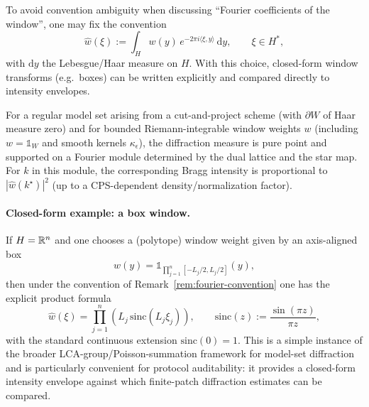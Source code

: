 \begin{remark}\label{rem:fourier-convention}
To avoid convention ambiguity when discussing ``Fourier coefficients of the window'', one may fix the convention
\[
\widehat{w}(\xi):=\int_H w(y)\,e^{-2\pi i \langle \xi,y\rangle}\,\mathrm{d}y,\qquad \xi\in H^\ast,
\]
with $\mathrm{d}y$ the Lebesgue/Haar measure on $H$. With this choice, closed-form window transforms (e.g.\ boxes) can be written explicitly and compared directly to intensity envelopes.
\end{remark}

\begin{proposition}\label{prop:diffraction-intensity}
For a regular model set arising from a cut-and-project scheme (with $\partial W$ of Haar measure zero) and for bounded Riemann-integrable window weights $w$ (including $w=\mathds{1}_W$ and smooth kernels $\kappa_\epsilon$), the diffraction measure is pure point and supported on a Fourier module determined by the dual lattice and the star map. For $k$ in this module, the corresponding Bragg intensity is proportional to $|\widehat w(k^\star)|^2$ (up to a CPS-dependent density/normalization factor).
\cite{Hof1995,BaakeGrimm2013,RichardStrungaru2017}
\end{proposition}

\paragraph{Closed-form example: a box window.}
If $H=\mathbb{R}^n$ and one chooses a (polytope) window weight given by an axis-aligned box
\[
w(y)=\mathds{1}_{\prod_{j=1}^n[-L_j/2,L_j/2]}(y),
\]
then under the convention of Remark~\ref{rem:fourier-convention} one has the explicit product formula
\[
\widehat w(\xi)=\prod_{j=1}^n \left(L_j\,\mathrm{sinc}(L_j \xi_j)\right),
\qquad
\mathrm{sinc}(z):=\frac{\sin(\pi z)}{\pi z},
\]
with the standard continuous extension $\mathrm{sinc}(0)=1$. This is a simple instance of the broader LCA-group/Poisson-summation framework for model-set diffraction and is particularly convenient for protocol auditability: it provides a closed-form intensity envelope against which finite-patch diffraction estimates can be compared.

